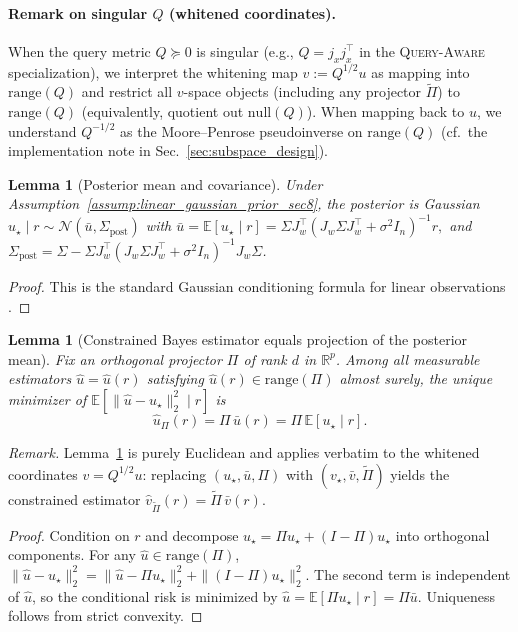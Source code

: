 \documentclass{article}
\theoremstyle{plain}
\newtheorem{lemma}[theorem]{Lemma}
\theoremstyle{definition}
\theoremstyle{remark}
\begin{document}
\paragraph{Remark on singular $Q$ (whitened coordinates).}
When the query metric $Q\succeq 0$ is singular (e.g., $Q=j_x j_x^\top$ in the \textsc{Query-Aware} specialization), we interpret the whitening map $v:=Q^{1/2}u$ as mapping into $\mathrm{range}(Q)$ and restrict all $v$-space objects (including any projector $\widetilde\Pi$) to $\mathrm{range}(Q)$ (equivalently, quotient out $\mathrm{null}(Q)$). When mapping back to $u$, we understand $Q^{-1/2}$ as the Moore--Penrose pseudoinverse on $\mathrm{range}(Q)$ (cf.\ the implementation note in Sec.~\ref{sec:subspace_design}).



\begin{lemma}[Posterior mean and covariance]
\label{lem:posterior_u_app}
Under Assumption~\ref{assump:linear_gaussian_prior_sec8}, the posterior is Gaussian
$u_\star\mid r\sim\mathcal{N}(\bar u,\Sigma_{\mathrm{post}})$ with $\bar u=\mathbb{E}[u_\star\mid r]=\Sigma J_w^\top(J_w\Sigma J_w^\top+\sigma^2 I_n)^{-1}r,$ and $
\Sigma_{\mathrm{post}}=\Sigma-\Sigma J_w^\top(J_w\Sigma J_w^\top+\sigma^2 I_n)^{-1}J_w\Sigma$.
\end{lemma}

\begin{proof}
This is the standard Gaussian conditioning formula for linear observations \citep[see][\S 2.3]{Bishop2006PRML}.
\end{proof}


\begin{lemma}[Constrained Bayes estimator equals projection of the posterior mean]
\label{lem:constrained_bayes_estimator_app}
Fix an orthogonal projector $\Pi$ of rank $d$ in $\mathbb{R}^p$. Among all measurable estimators
$\widehat u=\widehat u(r)$ satisfying $\widehat u(r)\in\mathrm{range}(\Pi)$ almost surely, the unique minimizer of
$\mathbb{E}[\|\widehat u-u_\star\|_2^2\mid r]$ is
\[
\widehat u_\Pi(r)=\Pi\,\bar u(r)=\Pi\,\mathbb{E}[u_\star\mid r].
\]
\end{lemma}
\noindent\textit{Remark.}
Lemma~\ref{lem:constrained_bayes_estimator_app} is purely Euclidean and applies verbatim to the whitened coordinates $v=Q^{1/2}u$: replacing $(u_\star,\bar u,\Pi)$ with $(v_\star,\bar v,\widetilde\Pi)$ yields the constrained estimator $\widehat v_{\widetilde\Pi}(r)=\widetilde\Pi\,\bar v(r)$.


\begin{proof}
Condition on $r$ and decompose $u_\star=\Pi u_\star+(I-\Pi)u_\star$ into orthogonal components. For any
$\widehat u\in\mathrm{range}(\Pi)$,
$\|\widehat u-u_\star\|_2^2=\|\widehat u-\Pi u_\star\|_2^2+\|(I-\Pi)u_\star\|_2^2$.
The second term is independent of $\widehat u$, so the conditional risk is minimized by
$\widehat u=\mathbb{E}[\Pi u_\star\mid r]=\Pi\bar u$. Uniqueness follows from strict convexity.
\end{proof}
\end{document}
